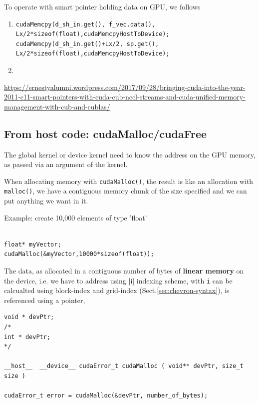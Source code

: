 To operate with smart pointer holding data on GPU, we follows

\begin{enumerate}
  \item   
  
\begin{lstlisting}
cudaMemcpy(d_sh_in.get(), f_vec.data(), Lx/2*sizeof(float),cudaMemcpyHostToDevice);
cudaMemcpy(d_sh_in.get()+Lx/2, sp.get(), Lx/2*sizeof(float),cudaMemcpyHostToDevice);
\end{lstlisting}

  \item 
\end{enumerate}

\url{https://ernestyalumni.wordpress.com/2017/09/28/bringing-cuda-into-the-year-2011-c11-smart-pointers-with-cuda-cub-nccl-streams-and-cuda-unified-memory-management-with-cub-and-cublas/}

\subsection{From host code: cudaMalloc/cudaFree}
\label{sec:host-code}
\label{sec:cudaMalloc}
\label{sec:cudaFree}

The global kernel or device kernel need to know the address on the GPU memory,
as passed via an argument of the kernel.

When allocating memory with \verb!cudaMalloc()!, the result is like an
allocation with \verb!malloc()!, we have a contiguous memory chunk of the size
specified and we can put anything we want in it.

Example: create 10,000 elements of type 'float'
\begin{verbatim}

float* myVector;
cudaMalloc(&myVector,10000*sizeof(float));
\end{verbatim}


The data, as allocated in a contiguous number of bytes of {\bf linear memory} on
the device, i.e. we have to address using [i] indexing scheme, with \verb!i! can
be calcualted using block-index and grid-index (Sect.\ref{sec:chevron-syntax}),
is referenced using a pointer,

\begin{verbatim}
void * devPtr;
/*
int * devPtr;
*/

__host__ ​ __device__ ​cudaError_t cudaMalloc ( void** devPtr, size_t size )

cudaError_t error = cudaMalloc(&devPtr, number_of_bytes);

\end{verbatim}
  
